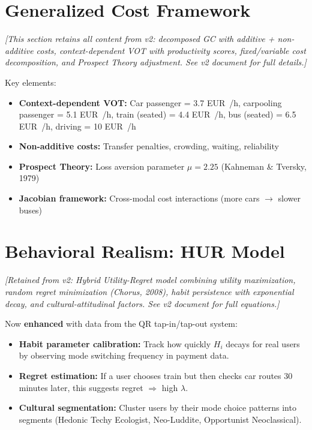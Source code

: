 \documentclass[11pt,a4paper]{article}
\begin{document}
\section{Generalized Cost Framework}
\label{sec:gc}

\textit{[This section retains all content from v2: decomposed GC with additive + non-additive costs, context-dependent VOT with productivity scores, fixed/variable cost decomposition, and Prospect Theory adjustment. See v2 document for full details.]}

Key elements:
\begin{itemize}[noitemsep]
    \item \textbf{Context-dependent VOT:} Car passenger = 3.7 EUR~/h, carpooling passenger = 5.1 EUR~/h, train (seated) = 4.4 EUR~/h, bus (seated) = 6.5 EUR~/h, driving = 10 EUR~/h
    \item \textbf{Non-additive costs:} Transfer penalties, crowding, waiting, reliability
    \item \textbf{Prospect Theory:} Loss aversion parameter $\mu = 2.25$ (Kahneman \& Tversky, 1979)
    \item \textbf{Jacobian framework:} Cross-modal cost interactions (more cars $\rightarrow$ slower buses)
\end{itemize}

\section{Behavioral Realism: HUR Model}
\label{sec:behavioral}

\textit{[Retained from v2: Hybrid Utility-Regret model combining utility maximization, random regret minimization (Chorus, 2008), habit persistence with exponential decay, and cultural-attitudinal factors. See v2 document for full equations.]}

Now \textbf{enhanced} with data from the QR tap-in/tap-out system:
\begin{itemize}[noitemsep]
    \item \textbf{Habit parameter calibration:} Track how quickly $H_i$ decays for real users by observing mode switching frequency in payment data.
    \item \textbf{Regret estimation:} If a user chooses train but then checks car routes 30 minutes later, this suggests regret $\Rightarrow$ high $\lambda$.
    \item \textbf{Cultural segmentation:} Cluster users by their mode choice patterns into segments (Hedonic Techy Ecologist, Neo-Luddite, Opportunist Neoclassical).
\end{itemize}
\end{document}
